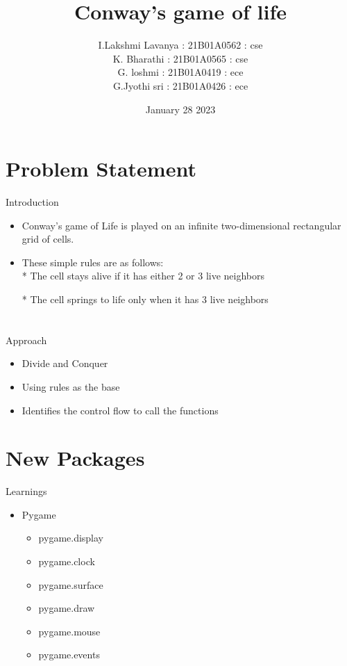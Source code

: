 \documentclass{beamer}
\title{ Conway's game of life}
\author[Svecw]{I.Lakshmi Lavanya : 21B01A0562 : cse \\ K. Bharathi :\;\;\;\;\;\;\; \;\;\;21B01A0565 : cse \\ G. loshmi : \;\;\;\;\;\;\;\;\;\;\;\;\;\;21B01A0419 : ece \\ G.Jyothi sri :\;\;\;\;\;\;\;\;\;\;\; 21B01A0426 : ece }
\date{January 28 2023}
\begin{document}
\begin{frame}
   \titlepage
\end{frame}

\section{Problem Statement}
\begin{frame}
{\huge Introduction}
\begin{itemize}
    \item Conway's game of Life is played on an infinite two-dimensional rectangular grid of cells. 

     \item These simple rules are as follows: \\
* The cell stays alive if it has either 2 or 3 live neighbors

* The cell springs to life only when it has 3 live neighbors

\end{itemize}
\end{frame}

\section{}

\begin{frame}{\huge Approach}

\begin{itemize}
     \item Divide and Conquer
     \item Using rules as the base
     \item Identifies the control flow to call the functions
\end{itemize}

\vskip 1cm

\end{frame}

\section{New Packages}

\begin{frame}{\huge Learnings}

\begin{itemize}
\item\huge Pygame 
\begin{itemize}
\vskip 1cm
\item pygame.display
\item pygame.clock
\item pygame.surface
\item pygame.draw
\item pygame.mouse
\item pygame.events
\end {itemize}
\end{itemize}
\end{frame}
\end{document}
